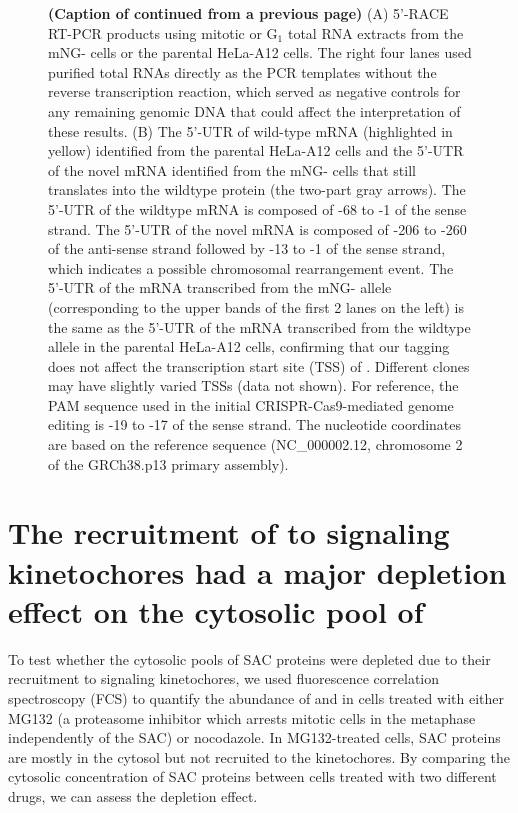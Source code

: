 \begin{figure} [t!]
    \noindent\justifying \textbf{(Caption of  continued from a previous page)} (A) 5'-RACE RT-PCR products using mitotic or G$_1$ total RNA extracts from  the mNG- cells or the parental HeLa-A12 cells. The right four lanes used purified total RNAs directly as the PCR templates without the reverse transcription reaction, which served as negative controls for any remaining genomic DNA that could affect the interpretation of these results. (B) The 5'-UTR of wild-type  mRNA (highlighted in yellow) identified from the parental HeLa-A12 cells and the 5'-UTR of the novel  mRNA identified from the mNG- cells that still translates into the wildtype  protein (the two-part gray arrows). The 5'-UTR of the wildtype  mRNA is composed of -68 to -1 of the sense strand. The 5'-UTR of the novel  mRNA is composed of -206 to -260 of the anti-sense strand followed by -13 to -1 of the sense strand, which indicates a possible chromosomal rearrangement event. The 5'-UTR of the mRNA transcribed from the mNG- allele (corresponding to the upper bands of the first 2 lanes on the left) is the same as the 5'-UTR of the mRNA transcribed from the wildtype  allele in the parental HeLa-A12 cells, confirming that our  tagging does not affect the transcription start site (TSS) of . Different clones may have slightly varied TSSs (data not shown). For reference, the PAM sequence used in the initial CRISPR-Cas9-mediated genome editing is -19 to -17 of the sense strand. The nucleotide coordinates are based on the reference sequence (NC\_000002.12, chromosome 2 of the GRCh38.p13 primary assembly).
\end{figure}

\section{The recruitment of  to signaling kinetochores had a major depletion effect on the cytosolic pool of }

To test whether the cytosolic pools of SAC proteins were depleted due to their recruitment to signaling kinetochores, we used fluorescence correlation spectroscopy (FCS) to quantify the abundance of  and  in cells treated with either MG132 (a proteasome inhibitor which arrests mitotic cells in the metaphase independently of the SAC) or nocodazole. In MG132-treated cells, SAC proteins are mostly in the cytosol but not recruited to the kinetochores. By comparing the cytosolic concentration of SAC proteins between cells treated with two different drugs, we can assess the depletion effect.

